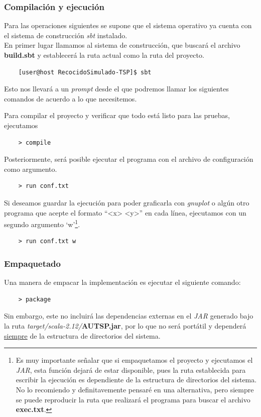 \documentclass[12pt]{article}
\begin{document}
\subsubsection*{Compilación y ejecución}
Para las operaciones siguientes se supone que el sistema operativo ya cuenta con el sistema de construcción \textit{sbt} instalado.\\

\noindent
En primer lugar llamamos al sistema de construcción, que buscará el
archivo \textbf{build.sbt} y establecerá la ruta actual como la ruta
del proyecto.
\begin{verbatim}
    [user@host RecocidoSimulado-TSP]$ sbt
\end{verbatim}
Esto nos llevará a un \textit{prompt} desde el que podremos llamar
los siguientes comandos de acuerdo a lo que necesitemos.

Para compilar el proyecto y verificar que todo está listo para las pruebas, ejecutamos
\begin{verbatim}
    > compile
\end{verbatim}
Posteriormente, será posible ejecutar el programa con el archivo de configuración como argumento.
\begin{verbatim}
    > run conf.txt
\end{verbatim}

Si deseamos guardar la ejecución para poder graficarla con \textit{gnuplot} o algún otro programa que acepte el formato ``<x>\; <y>'' en cada línea, ejecutamos con un segundo argumento `w'\footnote{Es muy importante señalar que si empaquetamos el proyecto y ejecutamos el \textit{JAR}, esta función dejará de estar disponible, pues la ruta establecida para escribir la ejecución
es dependiente de la estructura de directorios del sistema. No lo recomiendo y definitavemente pensaré en una alternativa, pero siempre se puede reproducir la ruta que realizará el programa para buscar el archivo \textbf{exec.txt}.}. 
\begin{verbatim}
    > run conf.txt w
\end{verbatim}
\subsubsection*{Empaquetado}
Una manera de empacar la implementación es ejecutar el siguiente comando:
\begin{verbatim}
    > package
\end{verbatim}
Sin embargo, este no incluirá las dependencias externas en el \textit{JAR} generado bajo la ruta \textit{target/scala-2.12/}\textbf{AUTSP.jar}, por lo que no será portátil y dependerá \underline{siempre} de la estructura de directorios del sistema.
\end{document}
